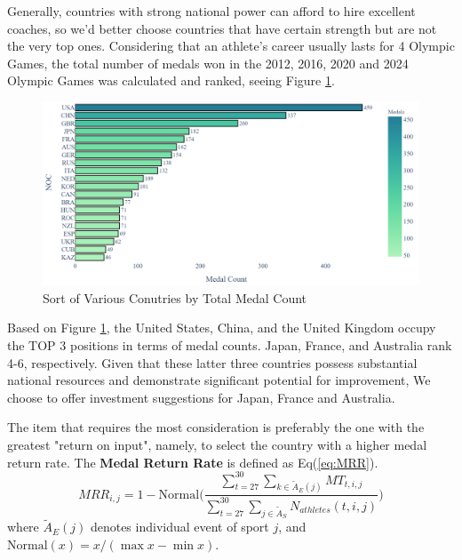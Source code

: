 \documentclass{mcmthesis}
\begin{document}
Generally, countries with strong national power can afford to hire excellent coaches, so we'd better choose countries that have certain strength but are not the very top ones. Considering that an athlete's career usually lasts for 4 Olympic Games, the total number of medals won in the 2012, 2016, 2020 and 2024 Olympic Games was calculated and ranked, seeing Figure \ref{fig:medal_count_by_noc}.

\begin{figure}[H]
	\centering
	\includegraphics[width=1\linewidth]{fig/Medal_Count_by_NOC.png}
	\caption{Sort of Various Conutries by Total Medal Count}
	\label{fig:medal_count_by_noc}
\end{figure}


Based on Figure \ref{fig:medal_count_by_noc}, the United States, China, and the United Kingdom occupy the TOP 3 positions in terms of medal counts. Japan, France, and Australia rank 4-6, respectively. Given that these latter three countries possess substantial national resources and demonstrate significant potential for improvement, We choose to offer investment suggestions for Japan, France and Australia.



The item that requires the most consideration is preferably the one with the greatest "return on input", namely, to select the country with a higher medal return rate. The \textbf{Medal Return Rate} is defined as Eq(\ref{eq:MRR}).
\begin{equation}
MRR_{i,j}=1-\text{Normal}
\Bigg( 
\frac{ \sum_{t=27}^{30} \sum_{k\in \tilde{A}_{E}(j)} MT_{t,i,j} }{ \sum_{t=27}^{30} \sum_{j\in \tilde{A}_{S}} N_{athletes}(t,i,j) }
\Bigg)
\label{eq:MRR}
\end{equation}
where $\tilde{A}_{E}(j)$ denotes individual event of sport $j$, and $\text{Normal}(x)=x/(\max{x} - \min{x})$. 
\end{document}
